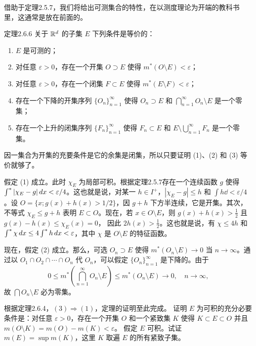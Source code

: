 借助于定理2.5.7，我们将给出可测集合的特性，在以测度理论为开端的教科书里，这通常是放在前面的。
\begin{statement}{定理}{2.6.6}
关于 $\mathbb R^d$ 的子集 $E$ 下列条件是等价的：
\begin{enumerate}[label=(\arabic*)]
\item $E$ 是可测的；
\item 对任意 $\varepsilon>0$，存在一个开集 $O\supset E$ 使得 $m^*(O\setminus E)<\varepsilon$；
\item[(2')] 对任意 $\varepsilon>0$，存在一个闭集 $F\subset E$ 使得 $m^*(E\setminus F)<\varepsilon$；
\item[(3)] 存在一个下降的开集序列 $\{O_n\}_{n=1}^\infty$ 使得 $O_n\supset E$ 和 $\bigcap_{n=1}^\infty O_n\setminus E$ 是一个零集；
\item[(3')] 存在一个上升的闭集序列 $\{F_n\}_{n=1}^\infty$ 使得 $F_n\subset E$ 和 $E\setminus\bigcup_{n=1}^\infty F_n$ 是一个零集。
\end{enumerate}
\end{statement}
\Proof 因一集合为开集的充要条件是它的余集是闭集，所以只要证明 (1)、(2) 和 (3) 等价就够了。

假定 (1) 成立。此时 $\chi_E$ 为局部可积。根据定理2.5.7存在一个连续函数 $g$ 使得 $\int^{*}|\chi_E-g|\,dx<\varepsilon/4$。这也就是说，对某一 $h\in I^+$，$|\chi_E-g|\le h$ 和 $\int h\dd<\varepsilon/4$。设 $O=\{x;g(x)+h(x)>1/2\}$，因 $g+h$ 下方半连续，它是开集。其次，不等式 $\chi_E\le g+h$ 表明 $E\subset O$。现在，若 $x\in O\setminus E$，则 $g(x)+h(x)>\frac12$ 且 $g(x)-h(x)\le\chi_E(x)=0$，
因此 $2h(x)>\frac12$。这也就是说，有 $\chi\le4h$ 和 $\int^{*}\chi\,dx\le4\int^{*} h\,dx<\varepsilon$，其中 $\chi$ 是 $O\setminus E$ 的特征函数。

现在，假定 (2) 成立。那么，可选 $O_n\supset E$ 使得 $m^*(O_n\setminus E)\to0$ 当 $n\to\infty$。通过以 $O_1\cap O_2\cap\cdots\cap O_n$ 代 $O_n$，可以假定 $\{O_n\}_{n=1}^\infty$ 是下降的。由于
\[0\le m^*\left(\bigcap_{n=1}^\infty O_n\setminus E\right)\le m^*(O_n\setminus E)\longrightarrow0,\quad n\to\infty,\]
故 $\bigcap O_n\setminus E$ 必为零集。

根据定理2.6.4，$(3)\Longrightarrow(1)$，定理的证明至此完成。
\Exercise 证明 $E$ 为可积的充分必要条件是：对任意 $\varepsilon>0$，存在一个开集 $O$ 和一个紧致集 $K$ 使得 $K\subset E\subset O$ 并且 $m(O\setminus K)=m(O)-m(K)<\varepsilon$。
\Exercise 假定 $E$ 可积。试证 $m(E)=\sup m(K)$，这里 $K$ 取遍 $E$ 的所有紧致子集。

